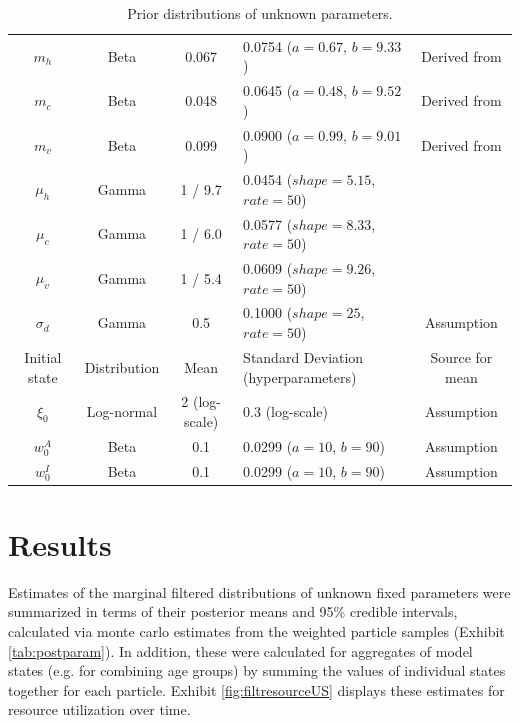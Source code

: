 \documentclass{article}
\begin{document}
\begin{table}
\begin{center}
\begin{tabular}{|c|c|c|l|c|}
$m_h$ & Beta & 0.067 & 0.0754 ($a = 0.67$, $b = 9.33$) & Derived from \citet{Petrilli:2020} \\
$m_c$ & Beta & 0.048 & 0.0645 ($a = 0.48$, $b = 9.52$) & Derived from \citet{Petrilli:2020} \\
$m_v$ & Beta & 0.099 & 0.0900 ($a = 0.99$, $b = 9.01$) & Derived from \citet{Petrilli:2020} \\
$\mu_h$ & Gamma & 1 / 9.7 & 0.0454 ($shape = 5.15$, $rate = 50$) & \citet{moghadasCOVID} \\
$\mu_c$ & Gamma & 1 / 6.0 & 0.0577 ($shape = 8.33$, $rate = 50$) & \citet{ICNARC:2020} \\
$\mu_v$ & Gamma & 1 / 5.4 & 0.0609 ($shape = 9.26$, $rate = 50$) & \citet{Argenziano:2020} \\
$\sigma_d$ & Gamma & 0.5 & 0.1000 ($shape = 25$, $rate = 50$) & Assumption \\
\hline
Initial state & Distribution & Mean & \makecell{Standard Deviation \\ (hyperparameters)} & Source for mean \\
\hline
$\xi_0$ & Log-normal & 2 (log-scale) & 0.3 (log-scale) & Assumption \\
$w^A_0$ & Beta & 0.1 & 0.0299 ($a = 10$, $b = 90$) & Assumption \\
$w^I_0$ & Beta & 0.1 & 0.0299 ($a = 10$, $b = 90$) & Assumption \\
\hline
\end{tabular}
\caption{Prior distributions of unknown parameters.}
\label{tab:priors}
\end{center}
\end{table}

\section{Results \label{sec:results}}

Estimates of the marginal filtered distributions of unknown fixed parameters were summarized in terms of their posterior means and 95\% credible intervals, calculated via monte carlo estimates from the weighted particle samples (Exhibit \ref{tab:postparam}). In addition, these were calculated for aggregates of model states (e.g. for combining age groups) by summing the values of individual states together for each particle. Exhibit \ref{fig:filtresourceUS} displays these estimates for resource utilization over time.
\end{document}
